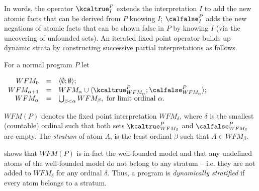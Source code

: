 %
In words, the operator $\kcaltrue^P_I$ extends the interpretation $I$ to add
the new atomic facts that can be derived from $P$ knowing $I$; $\calfalse^P_I$
adds the new negations of atomic facts that can be shown false in $P$
by knowing $I$ (via the uncovering of unfounded sets).  An iterated
fixed point operator builds up dynamic strata by constructing
successive partial interpretations as follows.
\begin{definition}
\label{def:IFP}
For a normal program $P$ let 

\begin{center}
$  \begin{array}{rcl}
          WFM_0 & = & \langle \emptyset ; \emptyset \rangle;      \\
 WFM_{\alpha+1} & = &       WFM_{\alpha} \cup
                                \langle \kcaltrue^P_{WFM_\alpha};\calfalse^P_{WFM_\alpha} \rangle; \\
     WFM_\alpha & = & \bigcup_{\beta < \alpha} WFM_\beta, \mbox{ for limit ordinal }\alpha.
  \end{array}
$
\end{center}

\noindent
  $WFM(P)$ denotes the fixed point interpretation $WFM_\delta$,
  where $\delta$ is the smallest (countable) ordinal such that both
  sets $\kcaltrue^P_{WFM_\delta}$ and $\calfalse^P_{WFM_\delta}$ are empty.
The {\em stratum} of atom $A$, is the least ordinal $\beta$ such that
   $A \in WFM_{\beta}$.
\end{definition}
%
\cite{Przy89d} shows that %
$WFM(P)$ is in fact the well-founded model and that any undefined
atoms of the well-founded model do not belong to any stratum --
i.e. they are not added to $WFM_{\delta}$ for any ordinal
$\delta$. Thus, a program is \emph{dynamically stratified} if every
atom belongs to a stratum.


%
